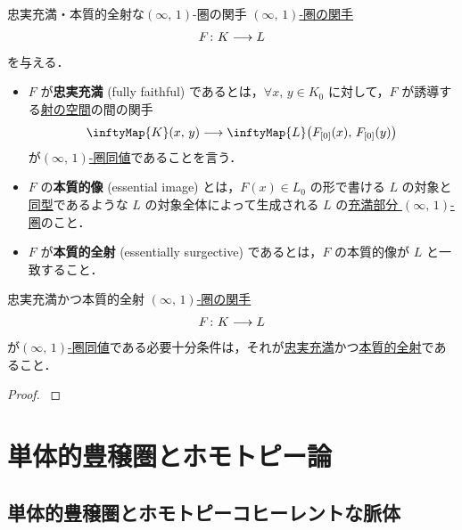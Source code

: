 \documentclass[TQFT_main]{subfiles}
\begin{document}
\begin{mydef}[label=def:FF-ES-infty]{忠実充満・本質的全射な{$(\infty,\, 1)$}-圏の関手}
    \hyperref[def:infinity-1]{$(\infty,\, 1)$-圏の関手}
    \begin{align}
        F \colon K \longrightarrow L
    \end{align}
    を与える．
    \begin{itemize}
        \item $F$ が\textbf{忠実充満} (fully faithful) であるとは，$\forall x,\, y \in K_0$ に対して，$F$ が誘導する\hyperref[def:Map]{射の空間}の間の関手
        \begin{align}
            \inftyMap{K} (x,\, y) \lto \inftyMap{L} \bigl( F_{[0]}(x),\, F_{[0]}(y) \bigr) 
        \end{align}
        が\hyperref[def:equiv-infty]{$(\infty,\, 1)$-圏同値}であることを言う．
        \item $F$ の\textbf{本質的像} (essential image) とは，$F(x) \in L_0$ の形で書ける $L$ の対象と\hyperref[def:iso-infty]{同型}であるような $L$ の対象全体によって生成される $L$ の\hyperref[def:fullsub-infty]{充満部分 $(\infty,\, 1)$-圏}のこと．
        \item $F$ が\textbf{本質的全射} (essentially surgective) であるとは，$F$ の本質的像が $L$ と一致すること．
    \end{itemize}
\end{mydef}

\begin{myprop}[label=prop:equiv-FF-ES]{忠実充満かつ本質的全射}
        \hyperref[def:infinity-1]{$(\infty,\, 1)$-圏の関手}
    \begin{align}
        F \colon K \longrightarrow L
    \end{align}
    が\hyperref[def:equiv-infty]{$(\infty,\, 1)$-圏同値}である必要十分条件は，それが\hyperref[def:FF-ES-infty]{忠実充満}かつ\hyperref[def:FF-ES-infty]{本質的全射}であること．
\end{myprop}

\begin{proof}
    \cite[\href{https://kerodon.net/tag/01JX}{Tag 01JX}]{kerodon}
\end{proof}


\section{単体的豊穣圏とホモトピー論}

\subsection{単体的豊穣圏とホモトピーコヒーレントな脈体}
\end{document}
